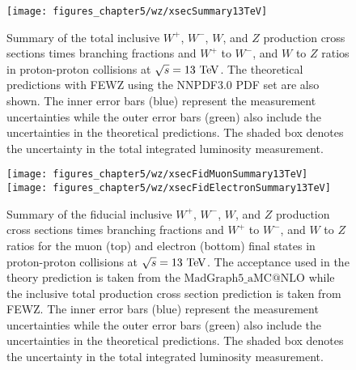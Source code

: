 \begin{figure}[htbp]
\centering
\texttt{[image: figures\_chapter5/wz/xsecSummary13TeV]}
\caption{Summary of the total inclusive $W^+$, $W^-$, $W$, and $Z$ production cross sections times branching fractions and $W^+$ to $W^-$, and $W$ to $Z$ ratios in proton-proton collisions at $\sqrt{s}=13~\mathrm{Te\kern -0.1em V}$. The theoretical predictions with FEWZ using the NNPDF3.0 PDF set are also shown. The inner error bars (blue) represent the measurement uncertainties while the outer error bars (green) also include the uncertainties in the theoretical predictions. The shaded box denotes the uncertainty in the total integrated luminosity measurement.}
\label{fig:13tev}
\end{figure}
\begin{figure}[htbp]
\centering
\texttt{[image: figures\_chapter5/wz/xsecFidMuonSummary13TeV]}
\texttt{[image: figures\_chapter5/wz/xsecFidElectronSummary13TeV]}
\caption{Summary of the fiducial inclusive $W^+$, $W^-$, $W$, and $Z$ production cross sections times branching fractions and $W^+$ to $W^-$, and $W$ to $Z$ ratios for the muon (top) and electron (bottom) final states in proton-proton collisions at $\sqrt{s}=13~\mathrm{Te\kern -0.1em V}$. The acceptance used in the theory prediction is taken from the $\mathrm{MadGraph5}\_\mathrm{aMC@NLO}$ while the inclusive total production cross section prediction is taken from FEWZ. The inner error bars (blue) represent the measurement uncertainties while the outer error bars (green) also include the uncertainties in the theoretical predictions. The shaded box denotes the uncertainty in the total integrated luminosity measurement.}
\label{fig:fid}
\end{figure}
